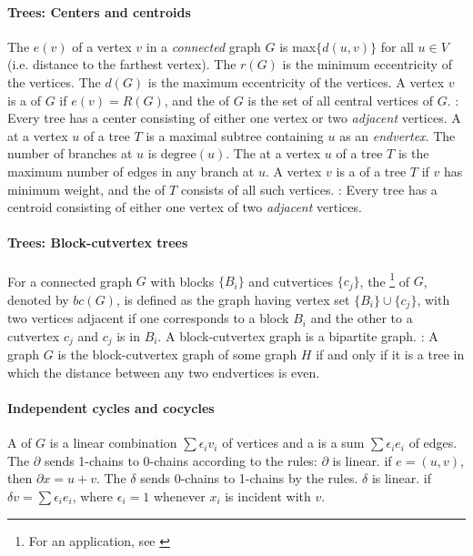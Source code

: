\documentclass{myproc}
\def\sbf{\bfseries}
\begin{document}
\paragraph{Trees: Centers and centroids}
\bit
\w The  $e(v)$ of a vertex $v$ in a {\em connected\/} graph
$G$ is max$\{d(u, v)\}$ for all $u \in V$ (i.e. distance to the farthest
vertex). 
\w The  $r(G)$ is the minimum eccentricity of the vertices.
\w The  $d(G)$ is the maximum eccentricity of the vertices.
\w A vertex $v$ is a  of $G$ if $e(v) = R(G)$, and
 the  of $G$ is the set of all central vertices of $G$.
\w {\sbf Theorem}: Every tree has a center consisting of either one vertex or
two {\em adjacent\/} vertices.
\w A  at a vertex $u$ of a tree $T$ is a maximal subtree containing
  $u$ as an {\em endvertex\/}. 
\w The number of branches at $u$ is $\mbox{degree}(u)$.
\w The  at a vertex $u$ of a tree $T$ is the maximum number of 
  edges in any branch at $u$.
\w A vertex $v$ is a  of a tree $T$ if $v$ has minimum 
   weight, and the  of $T$ consists of all such vertices.
\w {\sbf Theorem}: Every tree has a centroid consisting of either one vertex
of two {\em adjacent\/} vertices. 
\eit

\paragraph{Trees: Block-cutvertex trees}
\bit
\w For a connected graph $G$ with blocks $\{B_i\}$ and cutvertices $\{c_j\}$,
the \footnote{For an application, see \cite{TV84}}
 of $G$, denoted by $bc(G)$, is defined as the
graph having vertex set $\{B_i\} \cup \{c_j\}$, with two vertices adjacent if
one corresponds to a block $B_i$ and the other to a cutvertex $c_j$ and $c_j$
is in $B_i$.
\w A block-cutvertex graph is a bipartite graph.
\w {\sbf Theorem}:  A graph $G$ is the block-cutvertex graph of
some graph $H$ if and only if it is a tree in which the distance between any
two endvertices is even.
\eit

\paragraph{Independent cycles and cocycles}
\bit
\w A  of $G$ is a linear combination $\sum \epsilon_i v_i$
of vertices and a  is a sum $\sum \epsilon_i e_i$ of edges.
\w The  $\partial$ sends 1-chains to 0-chains according
to the rules:
  \ben
  \w [(a)] $\partial$ is linear.
  \w [(b)] if $e = (u, v)$, then $\partial x = u + v$.
  \een
\w The  $\delta$ sends 0-chains to 1-chains by the
rules. 
  \ben
  \w [(a)] $\delta$ is linear.
  \w [(b)] if $\delta v = \sum \epsilon_i e_i$, where $\epsilon_i = 1$
  whenever $x_i$ is incident with $v$.
  \een
\eit
\end{document}
